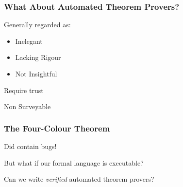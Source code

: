 \documentclass[usenames,dvipsnames]{beamer}
\begin{document}
\begin{frame}
  \frametitle{What About Automated Theorem Provers?}
  \pause

  Generally regarded as:
  \pause
  \begin{itemize}
    \item Inelegant \pause
    \item Lacking Rigour \pause
    \item Not Insightful \pause
  \end{itemize}

  \alert{Require trust}

  \alert{Non Surveyable}
\end{frame}
\begin{frame}
  \frametitle{The Four-Colour Theorem}

  Did contain bugs!
\end{frame}
\begin{frame}
  But what if our formal language is executable?

  \pause
  Can we write \emph{verified} automated theorem provers?

  \pause
\end{frame}
\end{document}

